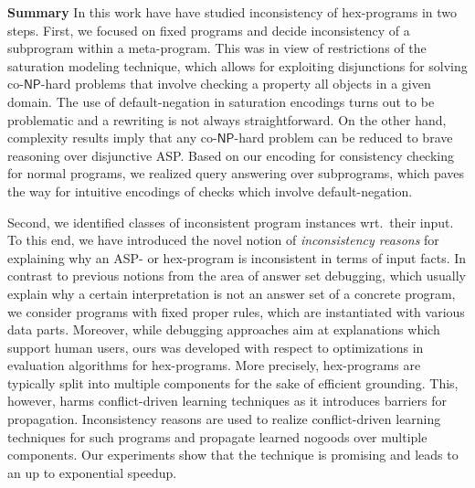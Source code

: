 \documentclass[11pt,fleqn,twoside]{article}
\newcommand{\leanparagraph}[1]{\smallskip\noindent\textbf{#1}}
\newcommand\hex{{\sc hex}\xspace}
\newcommand{\conp}{co-\ensuremath{\mathsf{NP}}\xspace}
\begin{document}
		\leanparagraph{Summary}
		In this work have have studied inconsistency of \hex-programs in two steps.
		First, we focused on fixed programs and decide inconsistency of a subprogram within a meta-program.
		This was in view of restrictions of the saturation modeling technique,
		which allows for exploiting disjunctions for solving \conp-hard problems
		that involve checking a property all objects in a given domain.
		The use of default-negation in saturation encodings turns out to be problematic and a rewriting is not always straightforward.
		On the other hand, complexity results imply that any \conp-hard problem can be reduced to brave reasoning over disjunctive ASP.
		Based on our encoding for consistency checking for normal programs, we realized query answering over subprograms,
		which paves the way for intuitive encodings of checks which involve default-negation.

		Second, we identified classes of inconsistent program instances wrt.~their input.
		To this end, we have introduced the novel notion of \emph{inconsistency reasons} for explaining why an ASP- or \hex-program is inconsistent in terms of input facts.
		In contrast to previous notions from the area of answer set debugging, which usually explain why a certain interpretation is not an answer set
		of a concrete program, we consider programs with fixed proper rules, which are instantiated with various data parts.
		Moreover, while debugging approaches aim at explanations which support human users, ours was developed with respect to
		optimizations in evaluation algorithms for \hex-programs. More precisely, \hex-programs are typically split into multiple components for the sake of efficient grounding.
		This, however, harms conflict-driven learning techniques as it introduces barriers for propagation.
		Inconsistency reasons are used to realize conflict-driven learning techniques
		for such programs and propagate learned nogoods over multiple components.
		Our experiments show that the technique is promising and leads to an up to exponential speedup.
		
\end{document}
